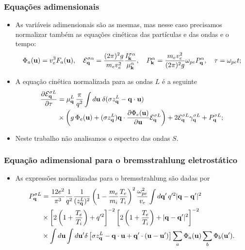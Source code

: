 \documentclass[10pt,aspectratio=1610,lualatex]{beamer}
\begin{document}
\begin{frame}
  \frametitle{Equações adimensionais}
  \begin{itemize}
    \item As variáveis adimensionais são as mesmas, mas nesse
    caso precisamos normalizar também as equações cinéticas das
    partículas e das ondas e o tempo:
    \begin{align*}
      \Phi_a({\bf u})=  v_e^3 F_a({\bf u}),
      \quad {\cal E}_{\bf q}^{\sigma\alpha}
      = \frac{(2\pi)^2 g}{m_ev_e^2}
      \frac{I_{\bf k}^{\sigma\alpha}}{\mu_{\bf k}^\alpha},
      \quad  P_{\bf k}^\alpha=\frac{m_ev_e^2}{(2\pi)^2g}
      \omega_{pe}P_{\bf q}^\alpha,
      \quad \tau = \omega_{pe}t;
    \end{align*}
    \item A equação cinética normalizada para as ondas $L$ é a
    seguinte
    \begin{equation*}
      \begin{split}
	\frac{\partial{\cal E}_{\bf q}^{\sigma L}}{\partial\tau}
	&=\mu_{\bf q}^L\,\frac{\pi}{q^2}\int d{\bf u}\;
	\delta(\sigma z_{\bf q}^L-{\bf q}\cdot{\bf u})\\
	&\times\biggl(g\,\Phi_e({\bf u})+(\sigma z_{\bf q}^L)
	{\bf q}\cdot\frac{\partial \Phi_e({\bf u})}{\partial{\bf u}}
	{\cal E}_{\bf q}^{\sigma L}\biggr) +2{\cal E}_{\bf q}^{\sigma L}
	\gamma_{\bf q}^{\sigma L}+P_{\bf q}^{\sigma L};
      \end{split}
    \end{equation*}
    \item Neste trabalho não analisamos o espectro das ondas $S$.
  \end{itemize}
\end{frame}

\begin{frame}
  \frametitle{Equação adimensional para o bremsstrahlung
    eletrostático}
  \begin{itemize}
    \item As expressões normalizadas para o bremsstrahlung são dadas por
    \begin{equation*}
      \begin{split}
	P_{\bf q}^{\sigma L} &= \frac{12e^2}{\pi^3}
	\frac{1}{q^2}\frac{1}{(z_{\bf q}^L)^2}
	\left(1-\frac{m_e}{m_i}\frac{T_e}{T_i}\right)^2
	\frac{\omega_{pe}^2}{v_e}\int d{\bf q'}\,q'^2|{\bf q-q'}|^2\\
	&\times \left[2\left(1+\frac{T_e}{T_i}\right)+q'^2\right]^{-2}
	\left[2\left(1+\frac{T_e}{T_i}\right) +|{\bf q-q'}|^2\right]^{-2}\\
	&\times \int d{\bf u}\int d{\bf u'} \delta \left[ \sigma
	  z_{\bf q}^L-{\bf q\cdot u} +{\bf q'}\cdot ({\bf u-u'})\right]
	\sum_a \Phi_a({\bf u})\sum_b \Phi_b({\bf u'}).
      \end{split}
    \end{equation*}
  \end{itemize}
\end{frame}
\end{document}
